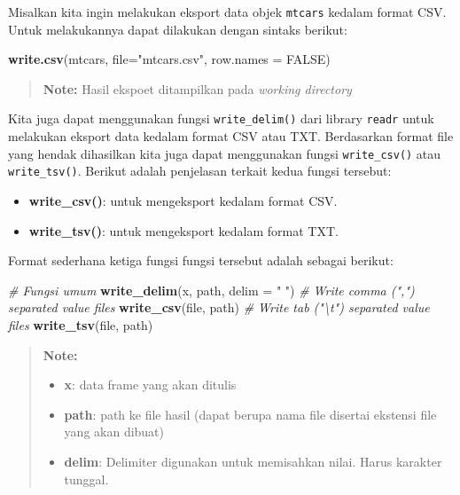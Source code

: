 \documentclass[]{book}
\newenvironment{Shaded}{\begin{snugshade}}{\end{snugshade}}
\newcommand{\KeywordTok}[1]{\textcolor[rgb]{0.13,0.29,0.53}{\textbf{#1}}}
\newcommand{\DataTypeTok}[1]{\textcolor[rgb]{0.13,0.29,0.53}{#1}}
\newcommand{\StringTok}[1]{\textcolor[rgb]{0.31,0.60,0.02}{#1}}
\newcommand{\CommentTok}[1]{\textcolor[rgb]{0.56,0.35,0.01}{\textit{#1}}}
\newcommand{\OtherTok}[1]{\textcolor[rgb]{0.56,0.35,0.01}{#1}}
\newcommand{\NormalTok}[1]{#1}
\providecommand{\tightlist}{%
  \setlength{\itemsep}{0pt}\setlength{\parskip}{0pt}}
\begin{document}
Misalkan kita ingin melakukan eksport data objek \texttt{mtcars} kedalam
format CSV. Untuk melakukannya dapat dilakukan dengan sintaks berikut:

\begin{Shaded}
\begin{Highlighting}[]
\KeywordTok{write.csv}\NormalTok{(mtcars, }\DataTypeTok{file=}\StringTok{"mtcars.csv"}\NormalTok{, }\DataTypeTok{row.names =} \OtherTok{FALSE}\NormalTok{)}
\end{Highlighting}
\end{Shaded}

\begin{quote}
\textbf{Note: } Hasil ekspoet ditampilkan pada \emph{working directory}
\end{quote}

Kita juga dapat menggunakan fungsi \texttt{write\_delim()} dari library
\texttt{readr} untuk melakukan eksport data kedalam format CSV atau TXT.
Berdasarkan format file yang hendak dihasilkan kita juga dapat
menggunakan fungsi \texttt{write\_csv()} atau \texttt{write\_tsv()}.
Berikut adalah penjelasan terkait kedua fungsi tersebut:

\begin{itemize}
\tightlist
\item
  \textbf{write\_csv()}: untuk mengeksport kedalam format CSV.
\item
  \textbf{write\_tsv()}: untuk mengeksport kedalam format TXT.
\end{itemize}

Format sederhana ketiga fungsi fungsi tersebut adalah sebagai berikut:

\begin{Shaded}
\begin{Highlighting}[]
\CommentTok{# Fungsi umum}
\KeywordTok{write_delim}\NormalTok{(x, path, }\DataTypeTok{delim =} \StringTok{" "}\NormalTok{)}
\CommentTok{# Write comma (",") separated value files}
\KeywordTok{write_csv}\NormalTok{(file, path)}
\CommentTok{# Write tab ("\textbackslash{}t") separated value files}
\KeywordTok{write_tsv}\NormalTok{(file, path)}
\end{Highlighting}
\end{Shaded}

\begin{quote}
\textbf{Note: }

\begin{itemize}
\tightlist
\item
  \textbf{x}: data frame yang akan ditulis
\item
  \textbf{path}: path ke file hasil (dapat berupa nama file disertai
  ekstensi file yang akan dibuat)
\item
  \textbf{delim}: Delimiter digunakan untuk memisahkan nilai. Harus
  karakter tunggal.
\end{itemize}
\end{quote}
\end{document}
